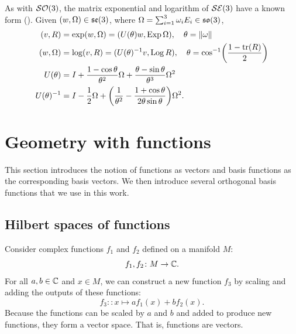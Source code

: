 \documentclass[../../main.tex]{subfiles}
\begin{document}
\begin{refsection}
	As with $\mathcal{SO} (3)$, the matrix exponential and logarithm of $\mathcal{SE} (3)$ have a known form (\cite[Section 10.6.9]{chirikjianStochasticModelsInformation2012}).
	Given $(w, \Omega) \in \mathfrak{se} (3)$, where $\Omega = \sum_{i=1}^3 \omega_i E_i \in \mathfrak{so} (3)$,
	\begin{align*}
		(v, R)         & = \exp(w, \Omega) = (U(\theta) w, \operatorname{Exp} \Omega), \quad \theta = \norm{\omega}                                \\
		(w, \Omega)    & = \log(v, R) = (U(\theta)^{-1} v, \operatorname{Log} R), \quad \theta = \cos[-1](\frac{1 - \tr(R)}{2})                    \\
		U(\theta)      & = I + \frac{1-\cos \theta}{\theta^{2}} \Omega+\frac{\theta-\sin \theta}{\theta^{3}} \Omega^{2}               \\
		U(\theta)^{-1} & = I - \frac{1}{2} \Omega + \qty(\frac{1}{\theta^2} - \frac{1 + \cos\theta}{2 \theta \sin\theta}) \Omega^{2}.
	\end{align*}

	\section{Geometry with functions}

	This section introduces the notion of functions as vectors and basis functions as the corresponding basis vectors.
	We then introduce several orthogonal basis functions that we use in this work.

	\subsection{Hilbert spaces of functions}

	Consider complex functions $f_1$ and $f_2$ defined on a manifold $M$:
	$$f_1, f_2 \colon M \to \mathbb{C}.$$
	For all $a,b \in \mathbb{C}$ and $x \in M$, we can construct a new function $f_3$ by scaling and adding the outputs of these functions:
	$$f_3 \colon: x \mapsto a f_1(x) + b f_2(x).$$
	Because the functions can be scaled by $a$ and $b$ and added to produce new functions, they form a vector space.
	That is, functions are vectors.


\end{refsection}
\end{document}
